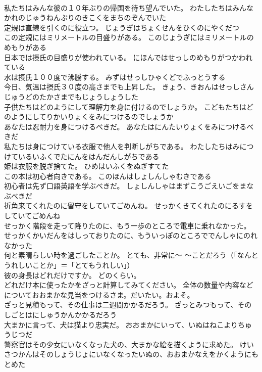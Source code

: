 \documentclass[8pt]{extreport}
\begin{document}
\begin{CJK}{UTF8}{min}
\\	私たちはみんな彼の１０年ぶりの帰国を待ち望んでいた。	わたしたちはみんなかれのじゅうねんぶりのきこくをまちのぞんでいた 
\\	定規は直線を引くのに役立つ。	じょうぎはちょくせんをひくのにやくだつ 
\\	この定規にはミリメートルの目盛りがある。	このじょうぎにはミリメートルのめもりがある 
\\	日本では摂氏の目盛りが使われている。	にほんではせっしのめもりがつかわれている 
\\	水は摂氏１００度で沸騰する。	みずはせっしひゃくどでふっとうする 
\\	今日、気温は摂氏３０度の高さまでも上昇した。	きょう、きおんはせっしさんじゅうどのたかさまでもじょうしょうした 
\\	子供たちはどのようにして理解力を身に付けるのでしょうか。	こどもたちはどのようにしてりかいりょくをみにつけるのでしょうか 
\\	あなたは忍耐力を身につけるべきだ。	あなたはにんたいりょくをみにつけるべきだ 
\\	私たちは身につけている衣服で他人を判断しがちである。	わたしたちはみにつけているいふくでたにんをはんだんしがちである 
\\	姫は衣服を脱ぎ捨てた。	ひめはいふくをぬぎすてた 
\\	この本は初心者向きである。	このほんはしょしんしゃむきである 
\\	初心者は先ず口語英語を学ぶべきだ。	しょしんしゃはまずこうごえいごをまなぶべきだ 
\\	折角来てくれたのに留守をしていてごめんね。	せっかくきてくれたのにるすをしていてごめんね 
\\	せっかく階段を走って降りたのに、もう一歩のところで電車に乗れなかった。	せっかくかいだんをはしっておりたのに、もういっぽのところででんしゃにのれなかった 
\\	何と素晴らしい時を過ごしたことか。	とても、非常に～ ～ことだろう（「なんとうれしいことか」＝「とてもうれしい」）
\\	彼の身長はどれだけですか。	どのくらい。
\\	どれだけ本に使ったかをざっと計算してみてください。	全体の数量や内容などについておおまかな見当をつけるさま。だいたい。およそ。
\\	ざっと見積もって、その仕事は二週間かかるだろう。	ざっとみつもって、そのしごとはにしゅうかんかかるだろう 
\\	大まかに言って、犬は猫より忠実だ。	おおまかにいって、いぬはねこよりちゅうじつだ 
\\	警察官はその少女にいなくなった犬の、大まかな絵を描くように求めた。	けいさつかんはそのしょうじょにいなくなったいぬの、おおまかなえをかくようにもとめた 

\end{CJK}
\end{document}
